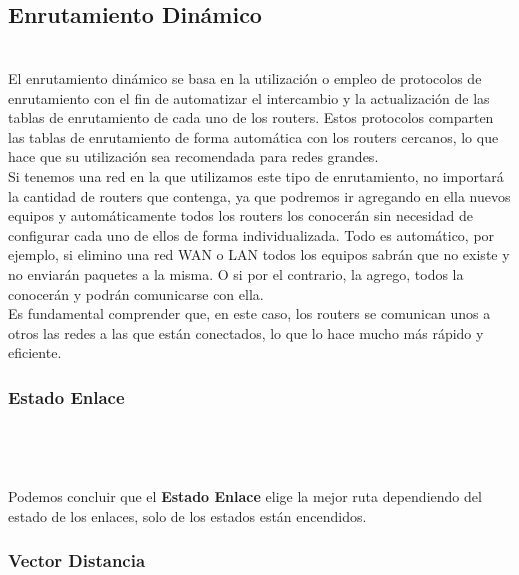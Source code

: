 \documentclass[a4paper]{report} %
\begin{document}
          \subsection{Enrutamiento Dinámico}
            \paragraph{}\mbox{} \\
              El enrutamiento dinámico se basa en la utilización o empleo de protocolos de enrutamiento con el fin de automatizar el intercambio y la actualización de las tablas de enrutamiento de cada uno de los routers. Estos protocolos comparten las tablas de enrutamiento de forma automática con los routers cercanos, lo que hace que su utilización sea recomendada para redes grandes.
              \\Si tenemos una red en la que utilizamos este tipo de enrutamiento, no importará la cantidad de routers que contenga, ya que podremos ir agregando en ella nuevos equipos y automáticamente todos los routers los conocerán sin necesidad de configurar cada uno de ellos de forma individualizada. Todo es automático, por ejemplo, si elimino una red WAN o LAN todos los equipos sabrán que no existe y no enviarán paquetes a la misma. O si por el contrario, la agrego, todos la conocerán y podrán comunicarse con ella.
              \\Es fundamental comprender que, en este caso, los routers se comunican unos a otros las redes a las que están conectados, lo que lo hace mucho más rápido y eficiente.
            \subsubsection{Estado Enlace}
              \paragraph{}\mbox{}\\
                \\\\Podemos concluir que el \textbf{Estado Enlace} elige la mejor ruta dependiendo del estado de los enlaces, solo de los estados están encendidos.

            \subsubsection{Vector Distancia}
\end{document}
